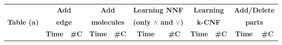 \begin{sidewaysfigure}[t]
  \centering
  \begin{tabular}[t]{|c@{}|@{}c@{}|@{}c@{}|@{}c@{}|@{}c@{}|@{}c@{}|@{}c@{}|@{}c@{}|@{}c@{}|@{}c@{}|@{}c@{}|}\hline
    {\multirow{2}{*} \textbf{}}  & \multicolumn{2}{c|}{\textbf{Add}} & \multicolumn{2}{c|}{\textbf{Add}} & \multicolumn{2}{c|}{\textbf{Learning NNF}}  &  \multicolumn{2}{c|}{\textbf{Learning}} &  \multicolumn{2}{c|}{\textbf{Add/Delete}} \\
    {\multirow{2}{*} \textbf{Table (a)}}  & \multicolumn{2}{c|}{\textbf{edge}} & \multicolumn{2}{c|}{\textbf{molecules}} & \multicolumn{2}{c|}{\textbf{(only $\land$ and $\lor$)}}  &  \multicolumn{2}{c|}{\textbf{k-CNF}} &  \multicolumn{2}{c|}{\textbf{parts}} \\
    \cline{2-11}
    {} & {\textbf{Time}} & {\textbf{\#C}} & {\textbf{Time}} & {\textbf{\#C}} & {\textbf{Time}} & {\textbf{\#C}} & {\textbf{Time}} & {\textbf{\#C}} & {\textbf{Time}} & {\textbf{\#C}} \\
    \hline
    

\end{tabular}
\end{sidewaysfigure}
